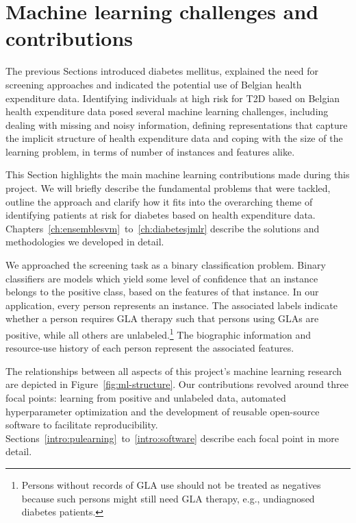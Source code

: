 \section{Machine learning challenges and contributions} \label{intro:machine-learning}
The previous Sections introduced diabetes mellitus, explained the need for screening approaches and indicated the potential use of Belgian health expenditure data. Identifying individuals at high risk for T2D based on Belgian health expenditure data posed several machine learning challenges, including dealing with missing and noisy information, defining representations that capture the implicit structure of health expenditure data and coping with the size of the learning problem, in terms of number of instances and features alike.

This Section highlights the main machine learning contributions made during this project. We will briefly describe the fundamental problems that were tackled, outline the approach and clarify how it fits into the overarching theme of identifying patients at risk for diabetes based on health expenditure data. Chapters~\ref{ch:ensemblesvm}~to~\ref{ch:diabetesjmlr} describe the solutions and methodologies we developed in detail.

We approached the screening task as a binary classification problem. Binary classifiers are models which yield some level of confidence that an instance belongs to the positive class, based on the features of that instance. In our application, every person represents an instance. The associated labels indicate whether a person requires GLA therapy such that persons using GLAs are positive, while all others are unlabeled.\footnote{Persons without records of GLA use should not be treated as negatives because such persons might still need GLA therapy, e.g., undiagnosed diabetes patients.} The biographic information and resource-use history of each person represent the associated features.

The relationships between all aspects of this project's machine learning research are depicted in Figure~\ref{fig:ml-structure}. Our contributions revolved around three focal points: learning from positive and unlabeled data, automated hyperparameter optimization and the development of reusable open-source software to facilitate reproducibility. Sections~\ref{intro:pulearning}~to~\ref{intro:software} describe each focal point in more detail.

